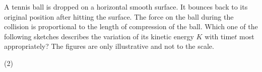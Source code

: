 
\item A tennis ball is dropped on a horizontal smooth surface. It bounces back to its original position after hitting the surface. The force on the ball during the collision is proportional to the length of compression of the ball. Which one of the following sketches describes the variation of its kinetic energy \( K \) with time\( t \) most appropriately? The figures are only illustrative and not to the scale.
    \begin{tasks}(2)
        \task 
        \begin{center}
        \end{center}
        \task 
        \begin{center}
        \end{center}
        \task 
        \begin{center}
        \end{center}
        \task 
        \begin{center}
        \end{center}
    \end{tasks}
